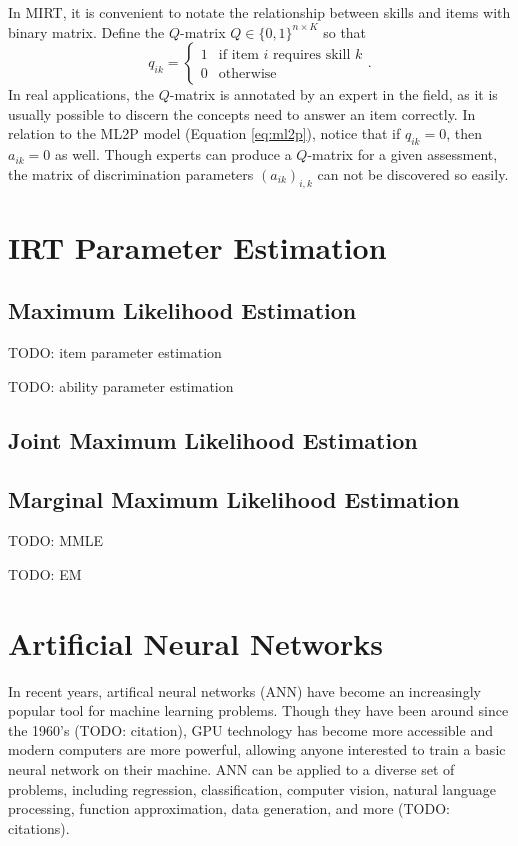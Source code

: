 In MIRT, it is convenient to notate the relationship between skills and items with binary matrix. Define the $Q$-matrix \cite{daSilva2018} $Q \in \{0,1\}^{n\times K}$ so that 
\begin{equation}
  q_{ik} = \begin{cases}
    1 & \text{if item } i \text{ requires skill } k\\
    0 & \text{otherwise}
  \end{cases}.
  \label{eq:q_matrix}
\end{equation}
In real applications, the $Q$-matrix is annotated by an expert in the field, as it is usually possible to discern the concepts need to answer an item correctly. In relation to the ML2P model (Equation \ref{eq:ml2p}), notice that if $q_{ik} = 0$, then $a_{ik} = 0$ as well. Though experts can produce a $Q$-matrix for a given assessment, the matrix of discrimination parameters $(a_{ik})_{i,k}$ can not be discovered so easily.

\section{IRT Parameter Estimation}

\subsection{Maximum Likelihood Estimation}
TODO: item parameter estimation

TODO: ability parameter estimation

\subsection{Joint Maximum Likelihood Estimation}


\subsection{Marginal Maximum Likelihood Estimation}
TODO: MMLE

TODO: EM 

\section{Artificial Neural Networks}
In recent years, artifical neural networks (ANN) have become an increasingly popular tool for machine learning problems. Though they have been around since the 1960's (TODO: citation), GPU technology has become more accessible and modern computers are more powerful, allowing anyone interested to train a basic neural network on their machine. ANN can be applied to a diverse set of problems, including regression, classification, computer vision, natural language processing, function approximation, data generation, and more (TODO: citations).

